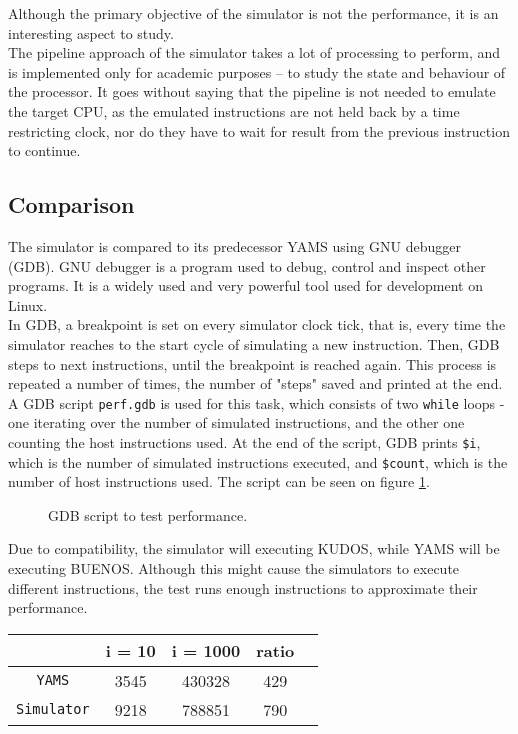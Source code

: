 Although the primary objective of the simulator is not the performance, it is
an interesting aspect to study.\\
The pipeline approach of the simulator takes a lot of processing to perform,
and is implemented only for academic purposes -- to study the state and behaviour
of the processor. It goes without saying that the pipeline is not needed to
emulate the target CPU, as the emulated instructions are not held back by a time
restricting clock, nor do they have to wait for result from the previous instruction to
continue.\\

\subsection{Comparison}
The simulator is compared to its predecessor YAMS using GNU debugger (GDB). GNU debugger
is a program used to debug, control and inspect other programs. It is a widely
used and very powerful tool used for development on Linux\cite{gdb}.\\
In GDB, a breakpoint is set on every simulator clock tick, that is, every time
the simulator reaches to the start cycle of simulating a new instruction. Then,
GDB steps to next instructions, until the breakpoint is reached again. This
process is repeated a number of times, the number of "steps" saved and printed
at the end. A GDB script \texttt{perf.gdb} is used for this task, which consists
of two \texttt{while} loops - one iterating over the number of simulated instructions,
and the other one counting the host instructions used. At the end of the script,
GDB prints \texttt{\$i}, which is the number of simulated instructions executed,
and \texttt{\$count}, which is the number of host instructions used. The script
can be seen on figure \ref{fig:gdb_perf}.
\begin{figure}

\caption{GDB script to test performance.}
\label{fig:gdb_perf}
\end{figure}

Due to compatibility, the simulator will executing KUDOS, while YAMS will be
executing BUENOS. Although this might cause the simulators to execute different
instructions, the test runs enough instructions to approximate their performance.

\begin{center}
    \begin{tabular}{ | c | c | c | c | r | }
    \hline
    & i = 10 & i = 1000 & ratio \\ \hline \hline
    \texttt{YAMS} & 3545 & 430328 &  429\\ \hline
    \texttt{Simulator} & 9218 & 788851 & 790 \\ \hline
    \end{tabular}
\end{center}

